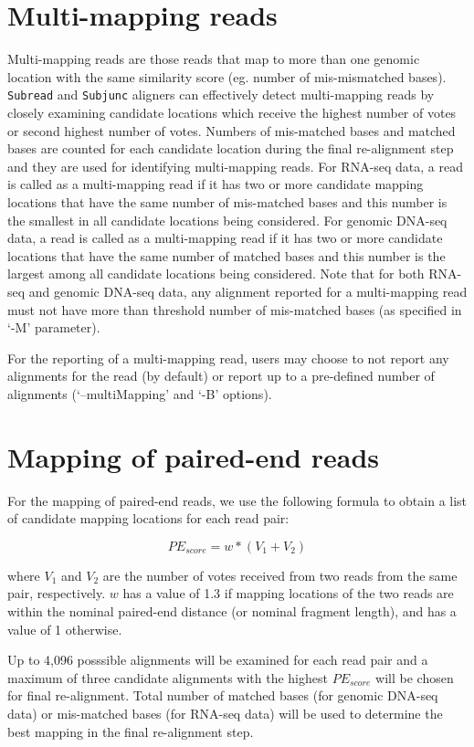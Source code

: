 \documentclass[12pt]{report}
\newcommand{\code}[1]{{\small\texttt{#1}}}
\begin{document}
\section{Multi-mapping reads}

Multi-mapping reads are those reads that map to more than one genomic location with the same similarity score (eg. number of mis-mismatched bases).
\code{Subread} and \code{Subjunc} aligners can effectively detect multi-mapping reads by closely examining candidate locations which receive the highest number of votes or second highest number of votes.
Numbers of mis-matched bases and matched bases are counted for each candidate location during the final re-alignment step and they are used for identifying multi-mapping reads.
For RNA-seq data, a read is called as a multi-mapping read if it has two or more candidate mapping locations that have the same number of mis-matched bases and this number is the smallest in all candidate locations being considered.
For genomic DNA-seq data, a read is called as a multi-mapping read if it has two or more candidate locations that have the same number of matched bases and this number is the largest among all candidate locations being considered.
Note that for both RNA-seq and genomic DNA-seq data, any alignment reported for a multi-mapping read must not have more than threshold number of mis-matched bases (as specified in `-M' parameter).

For the reporting of a multi-mapping read, users may choose to not report any alignments for the read (by default) or report up to a pre-defined number of alignments (`--multiMapping' and `-B' options).


\section{Mapping of paired-end reads}

For the mapping of paired-end reads, we use the following formula to obtain a list of candidate mapping locations for each read pair:

$$PE_{score} = w * (V_1 + V_2) $$

where $V_1$ and $V_2$ are the number of votes received from two reads from the same pair, respectively.
$w$ has a value of 1.3 if mapping locations of the two reads are within the nominal paired-end distance (or nominal fragment length), and has a value of 1 otherwise.

Up to 4,096 posssible alignments will be examined for each read pair and a maximum of three candidate alignments with the highest $PE_{score}$ will be chosen for final re-alignment.
Total number of matched bases (for genomic DNA-seq data) or mis-matched bases (for RNA-seq data) will be used to determine the best mapping in the final re-alignment step.
\end{document}
